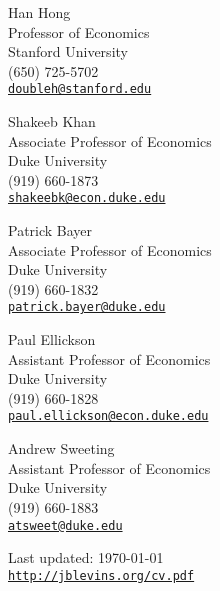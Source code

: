 \documentclass[letterpaper]{article}
\renewenvironment{itemize}{
  \begin{list}{}{
    \setlength{\leftmargin}{1em}
  }
}{
  \end{list}
}
\begin{document}
\begin{minipage}[t]{0.5\textwidth}
\begin{itemize}
\item Han Hong \\ Professor of Economics \\ Stanford University \\
  (650) 725-5702 \\
  \href{mailto:doubleh@stanford.edu}{\tt doubleh@stanford.edu}
\item Shakeeb Khan \\ Associate Professor of Economics \\ Duke University \\
  (919) 660-1873 \\
  \href{mailto:shakeebk@econ.duke.edu}{\tt shakeebk@econ.duke.edu}
\item Patrick Bayer \\ Associate Professor of Economics \\ Duke University \\
  (919) 660-1832 \\
  \href{mailto:patrick.bayer@duke.edu}{\tt patrick.bayer@duke.edu}
\end{itemize}
\end{minipage}
\begin{minipage}[t]{0.5\textwidth}
\begin{itemize}
\item Paul Ellickson \\ Assistant Professor of Economics \\ Duke University \\
  (919) 660-1828 \\
  \href{mailto:paul.ellickson@econ.duke.edu}{\tt paul.ellickson@econ.duke.edu}
\item Andrew Sweeting \\ Assistant Professor of Economics \\ Duke University \\
  (919) 660-1883 \\
  \href{mailto:atsweet@duke.edu}{\tt atsweet@duke.edu}
\end{itemize}
\end{minipage}


\bigskip

\begin{center}
\begin{footnotesize}
Last updated: \today \\
\href{http://jblevins.org/cv}{\tt http://jblevins.org/cv.pdf}
\end{footnotesize}
\end{center}
\end{document}
